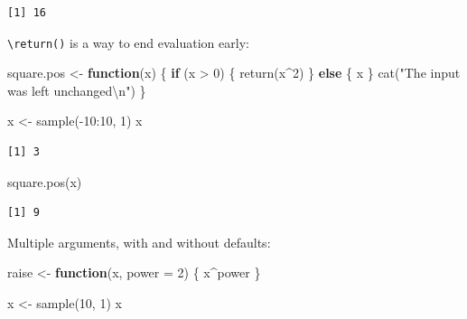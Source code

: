 \documentclass[
]{book}
\newenvironment{Shaded}{\begin{snugshade}}{\end{snugshade}}
\newcommand{\AttributeTok}[1]{\textcolor[rgb]{0.77,0.63,0.00}{#1}}
\newcommand{\ControlFlowTok}[1]{\textcolor[rgb]{0.13,0.29,0.53}{\textbf{#1}}}
\newcommand{\DecValTok}[1]{\textcolor[rgb]{0.00,0.00,0.81}{#1}}
\newcommand{\FunctionTok}[1]{\textcolor[rgb]{0.00,0.00,0.00}{#1}}
\newcommand{\NormalTok}[1]{#1}
\newcommand{\OtherTok}[1]{\textcolor[rgb]{0.56,0.35,0.01}{#1}}
\newcommand{\SpecialCharTok}[1]{\textcolor[rgb]{0.00,0.00,0.00}{#1}}
\newcommand{\StringTok}[1]{\textcolor[rgb]{0.31,0.60,0.02}{#1}}
\begin{document}
\begin{verbatim}
[1] 16
\end{verbatim}

\texttt{\textbackslash{}return()} is a way to end evaluation early:

\begin{Shaded}
\begin{Highlighting}[]
\NormalTok{square.pos }\OtherTok{\textless{}{-}} \ControlFlowTok{function}\NormalTok{(x) \{}
  \ControlFlowTok{if}\NormalTok{ (x }\SpecialCharTok{\textgreater{}} \DecValTok{0}\NormalTok{) \{}
    \FunctionTok{return}\NormalTok{(x}\SpecialCharTok{\^{}}\DecValTok{2}\NormalTok{)}
\NormalTok{  \} }\ControlFlowTok{else}\NormalTok{ \{}
\NormalTok{    x}
\NormalTok{  \}}
  \FunctionTok{cat}\NormalTok{(}\StringTok{"The input was left unchanged}\SpecialCharTok{\textbackslash{}n}\StringTok{"}\NormalTok{)}
\NormalTok{\}}

\NormalTok{x }\OtherTok{\textless{}{-}} \FunctionTok{sample}\NormalTok{(}\SpecialCharTok{{-}}\DecValTok{10}\SpecialCharTok{:}\DecValTok{10}\NormalTok{, }\DecValTok{1}\NormalTok{)}
\NormalTok{x}
\end{Highlighting}
\end{Shaded}

\begin{verbatim}
[1] 3
\end{verbatim}

\begin{Shaded}
\begin{Highlighting}[]
\FunctionTok{square.pos}\NormalTok{(x)}
\end{Highlighting}
\end{Shaded}

\begin{verbatim}
[1] 9
\end{verbatim}

Multiple arguments, with and without defaults:

\begin{Shaded}
\begin{Highlighting}[]
\NormalTok{raise }\OtherTok{\textless{}{-}} \ControlFlowTok{function}\NormalTok{(x, }\AttributeTok{power =} \DecValTok{2}\NormalTok{) \{}
\NormalTok{  x}\SpecialCharTok{\^{}}\NormalTok{power}
\NormalTok{\}}

\NormalTok{x }\OtherTok{\textless{}{-}} \FunctionTok{sample}\NormalTok{(}\DecValTok{10}\NormalTok{, }\DecValTok{1}\NormalTok{)}
\NormalTok{x}
\end{Highlighting}
\end{Shaded}
\end{document}
